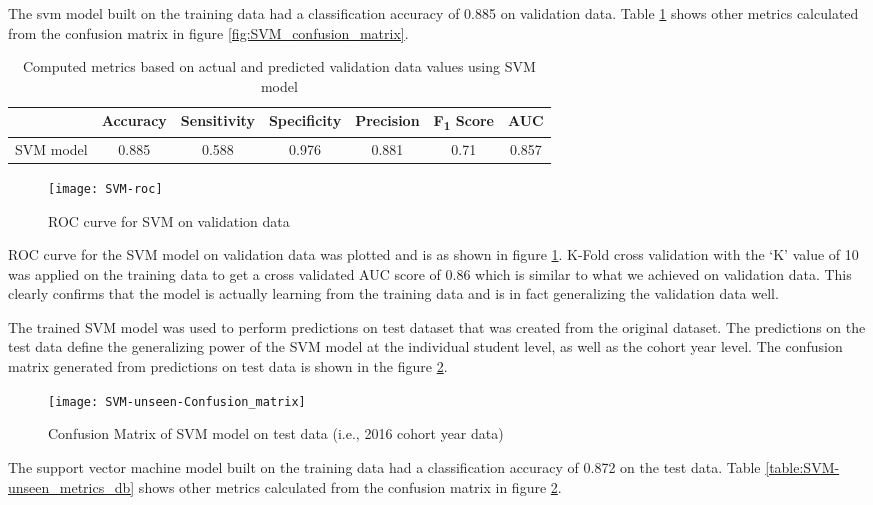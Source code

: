 \documentclass[11pt,openright]{report}
\begin{document}
The svm model built on the training data had a classification accuracy of 0.885 on validation data. Table \ref{table:SVM_confusion_matrix} shows other metrics calculated from the confusion matrix in figure \ref{fig:SVM_confusion_matrix}. 
\begin{table} [!htb]
	\renewcommand{\arraystretch}{1.3}
	\caption{Computed metrics based on actual and predicted validation data values using SVM model}
	\label{table:SVM_confusion_matrix}
	\centering
	\begin{tabular}{|c|c|c|c|c|c|c|}
    \hline
  	 & \bfseries Accuracy & \bfseries Sensitivity & \bfseries Specificity & \bfseries Precision & \bfseries F\textsubscript{1} Score  & \bfseries AUC\\  
    \hline
	SVM model & 0.885 & 0.588 & 0.976 & 0.881 & 0.71 & 0.857 \\ \hline
	\end{tabular} 
\end{table}

 \begin{figure}[!htb]
	\centering
	\texttt{[image: SVM-roc]}
	\caption{ROC curve for SVM on validation data}
	\label{fig:SVM_roc}
\end{figure} 

ROC curve for the SVM model on validation data was plotted and is as shown in figure \ref{fig:SVM_roc}. K-Fold cross validation with the `K' value of 10 was applied on the training data to get a cross validated AUC score of 0.86 which is similar to what we achieved on validation data. This clearly confirms that the model is actually learning from the training data and is in fact generalizing the validation data well.

The trained SVM model was used to perform predictions on test dataset that was created from the original dataset. The predictions on the test data define the generalizing power of the SVM model at the individual student level, as well as the cohort year level. The confusion matrix generated from predictions on test data is shown in the figure \ref{fig:SVM_unseen_confusion_matrix}.

  \begin{figure}[!htb]
	\centering
	\texttt{[image: SVM-unseen-Confusion\_matrix]}
	\caption{Confusion Matrix of SVM model on test data (i.e., 2016 cohort year data)}
	\label{fig:SVM_unseen_confusion_matrix}
\end{figure} 

The support vector machine model built on the training data had a classification accuracy of 0.872 on the test data. Table \ref{table:SVM-unseen_metrics_db} shows other metrics calculated from the confusion matrix in figure \ref{fig:SVM_unseen_confusion_matrix}.
\end{document}

